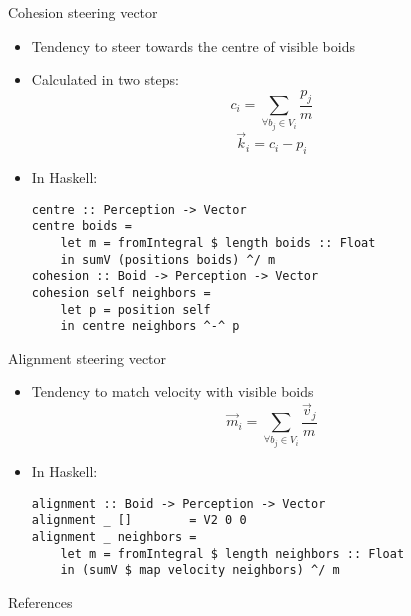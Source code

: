 \documentclass{beamer}
\begin{document}
\begin{frame}[fragile]
\huge{Cohesion steering vector}\normalsize
    \begin{itemize}
        \item Tendency to steer towards the centre of visible boids
        \item Calculated in two steps:
                \begin{equation}
        c_i = \sum\limits_{\forall b_j \in V_i} \frac{p_j}{m}
        \end{equation}
        \begin{equation}
        \vec{k}_i = c_i - p_i
        \end{equation}
        \item In Haskell:
        \begin{verbatim}
centre :: Perception -> Vector
centre boids =
    let m = fromIntegral $ length boids :: Float
    in sumV (positions boids) ^/ m
cohesion :: Boid -> Perception -> Vector
cohesion self neighbors =
    let p = position self
    in centre neighbors ^-^ p
        \end{verbatim}

    \end{itemize}


\end{frame}

\begin{frame}[fragile]
    \huge{Alignment steering vector}\normalsize
    \begin{itemize}
    \item Tendency to match velocity with visible boids
    \begin{equation*}
    \vec{m}_i = \sum\limits_{\forall b_j \in V_i} \frac{\vec{v}_j}{m}
    \end{equation*}
    \item In Haskell:
    \begin{verbatim}
alignment :: Boid -> Perception -> Vector
alignment _ []        = V2 0 0
alignment _ neighbors =
    let m = fromIntegral $ length neighbors :: Float
    in (sumV $ map velocity neighbors) ^/ m
    \end{verbatim}
    \end{itemize}

\end{frame}
\begin{frame}
\huge{References}\normalsize
 
 
\end{frame}
\end{document}
